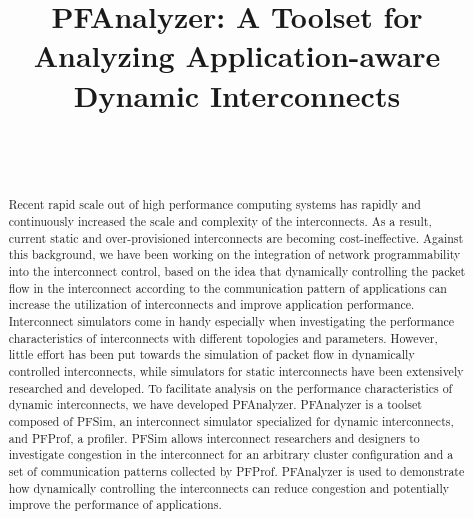\documentclass[conference]{IEEEtran}
\begin{document}
\title{PFAnalyzer: A Toolset for Analyzing Application-aware Dynamic Interconnects}

\author{%
     \\
     \\
}

\maketitle

\begin{abstract}
    Recent rapid scale out of high performance computing systems has
    rapidly and continuously increased the scale and complexity of the
    interconnects. As a result, current static and over-provisioned
    interconnects are becoming cost-ineffective. Against this background, we have
    been working on the integration of network programmability into
    the interconnect control, based on the idea that dynamically controlling
    the packet flow in the interconnect according to the communication pattern
    of applications can increase the utilization of interconnects and improve
    application performance. Interconnect simulators come in handy especially
    when investigating the performance characteristics of interconnects with
    different topologies and parameters. However, little effort has been put
    towards the simulation of packet flow in dynamically controlled interconnects,
    while simulators for static interconnects have been extensively researched
    and developed. To facilitate analysis on the performance
    characteristics of dynamic interconnects, we have developed PFAnalyzer.
    PFAnalyzer is a toolset composed of PFSim, an interconnect simulator
    specialized for dynamic interconnects, and PFProf, a profiler.
    PFSim allows interconnect researchers and designers to investigate
    congestion in the interconnect for an arbitrary cluster configuration and
    a set of communication patterns collected by PFProf. PFAnalyzer is used
    to demonstrate how dynamically controlling the interconnects can reduce
    congestion and potentially improve the performance of applications.
\end{abstract}
\end{document}
